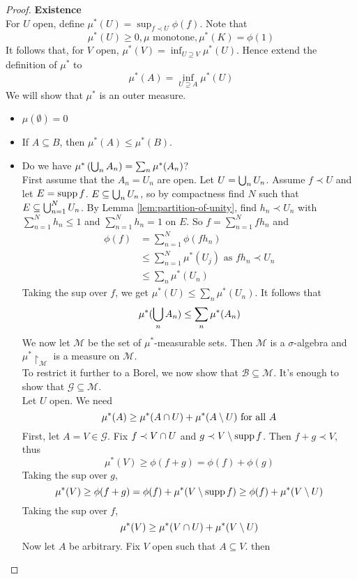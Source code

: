 \documentclass{article}
\begin{document}
\begin{proof}
  {\bf Existence} \\
  For $U$ open, define $\mu^*(U) = \sup_{f \prec U} \phi(f)$. Note that
  $$\mu^*(U) \ge 0, \mu \text{ monotone}, \mu^*(K) = \phi(1)$$
  It follows that, for $V$ open, $\mu^*(V) = \inf_{U \supseteq V} \mu^*(U)$. Hence extend the definition of $\mu^*$ to
  $$\mu^*(A) = \inf_{U \supseteq A} \mu^*(U)$$
  We will show that $\mu^*$ is an outer measure.
  \begin{itemize}
    \item $\mu(\emptyset) = 0$
    \item If $A \subseteq B$, then $\mu^*(A) \le \mu^*(B)$.
    \item Do we have $\mu^*\left(\bigcup_n A_n\right) = \sum_n \mu^*(A_n)$? \\
    First assume that the $A_n = U_n$ are open. Let $U = \bigcup_n U_n$. Assume $f \prec U$ and let $E = \operatorname{supp} f$. $E \subseteq \bigcup_n U_n$, so by compactness find $N$ such that $E \subseteq \bigcup_{n = 1}^N U_n$. By Lemma \ref{lem:partition-of-unity}, find $h_n \prec U_n$ with $\sum_{n = 1}^N h_n \le 1$ and $\sum_{n = 1}^N h_n = 1$ on $E$. So $f = \sum_{n = 1}^N fh_n$ and
    \begin{align*}
      \phi(f)
      & = \sum_{n = 1}^N \phi(fh_n) \\
      & \le \sum_{n = 1}^N \mu^*(U_j) \text{ as } fh_n \prec U_n \\
      & \le \sum_n \mu^*(U_n)
    \end{align*}
    Taking the sup over $f$, we get $\mu^*(U) \le \sum_n \mu^*(U_n)$. It follows that
    $$\mu^*(\bigcup_n A_n) \le \sum_n \mu^*(A_n)$$
    We now let $\mathcal M$ be the set of $\mu^*$-measurable sets. Then $\mathcal M$ is a $\sigma$-algebra and $\mu^*\restriction_{\mathcal M}$ is a measure on $\mathcal M$. \\
    To restrict it further to a Borel, we now show that $\mathcal B \subseteq \mathcal M$. It's enough to show that $\mathcal G \subseteq \mathcal M$. \\
    Let $U$ open. We need
    $$\mu^*(A) \ge \mu^*(A \cap U) + \mu^*(A \setminus U) \text{ for all } A$$
    First, let $A = V \in \mathcal G$. Fix $f \prec V \cap U$ and $g \prec V \setminus \operatorname{supp} f$. Then $f + g \prec V$, thus
    $$\mu^*(V) \ge \phi(f + g) = \phi(f) + \phi(g)$$
    Taking the sup over $g$,
    $$\mu^*(V) \ge \phi(f + g) = \phi(f) + \mu^*(V \setminus \operatorname{supp} f) \ge \phi(f) + \mu^*(V \setminus U)$$
    Taking the sup over $f$,
    $$\mu^*(V) \ge \mu^*(V \cap U) + \mu^*(V \setminus U)$$
    Now let $A$ be arbitrary. Fix $V$ open such that $A \subseteq V$. then

\end{itemize}
\end{proof}
\end{document}
